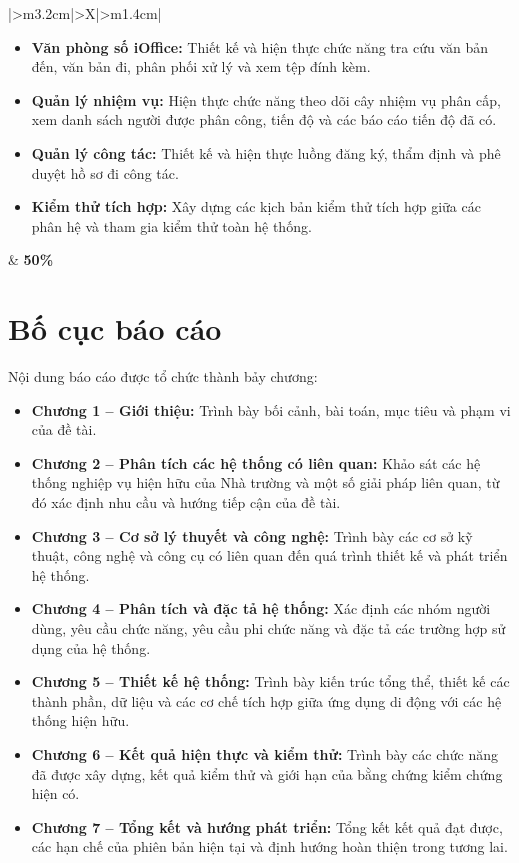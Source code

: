\begin{table}[H]
\begin{tabularx}{\textwidth}{|>{\centering\arraybackslash}m{3.2cm}|>{\arraybackslash}X|>{\centering\arraybackslash}m{1.4cm}|}
\parbox{\linewidth}{\vspace{4pt}\begin{itemize}[leftmargin=*, nosep]
  \item \textbf{Văn phòng số iOffice:} Thiết kế và hiện thực chức năng tra cứu văn bản đến, văn bản đi, phân phối xử lý và xem tệp đính kèm.
  \item \textbf{Quản lý nhiệm vụ:} Hiện thực chức năng theo dõi cây nhiệm vụ phân cấp, xem danh sách người được phân công, tiến độ và các báo cáo tiến độ đã có.
  \item \textbf{Quản lý công tác:} Thiết kế và hiện thực luồng đăng ký, thẩm định và phê duyệt hồ sơ đi công tác.
  \item \textbf{Kiểm thử tích hợp:} Xây dựng các kịch bản kiểm thử tích hợp giữa các phân hệ và tham gia kiểm thử toàn hệ thống.
\end{itemize}\vspace{4pt}} & \textbf{50\%} \\
\hline
\end{tabularx}
\end{table}

\section{Bố cục báo cáo}
\label{sec:bocuc_baocao}

Nội dung báo cáo được tổ chức thành bảy chương:

\begin{itemize}
  \item \textbf{Chương 1 -- Giới thiệu:} Trình bày bối cảnh, bài toán, mục tiêu và phạm vi của đề tài.
  \item \textbf{Chương 2 -- Phân tích các hệ thống có liên quan:} Khảo sát các hệ thống nghiệp vụ hiện hữu của Nhà trường và một số giải pháp liên quan, từ đó xác định nhu cầu và hướng tiếp cận của đề tài.
  \item \textbf{Chương 3 -- Cơ sở lý thuyết và công nghệ:} Trình bày các cơ sở kỹ thuật, công nghệ và công cụ có liên quan đến quá trình thiết kế và phát triển hệ thống.
  \item \textbf{Chương 4 -- Phân tích và đặc tả hệ thống:} Xác định các nhóm người dùng, yêu cầu chức năng, yêu cầu phi chức năng và đặc tả các trường hợp sử dụng của hệ thống.
  \item \textbf{Chương 5 -- Thiết kế hệ thống:} Trình bày kiến trúc tổng thể, thiết kế các thành phần, dữ liệu và các cơ chế tích hợp giữa ứng dụng di động với các hệ thống hiện hữu.
  \item \textbf{Chương 6 -- Kết quả hiện thực và kiểm thử:} Trình bày các chức năng đã được xây dựng, kết quả kiểm thử và giới hạn của bằng chứng kiểm chứng hiện có.
  \item \textbf{Chương 7 -- Tổng kết và hướng phát triển:} Tổng kết kết quả đạt được, các hạn chế của phiên bản hiện tại và định hướng hoàn thiện trong tương lai.
\end{itemize}
